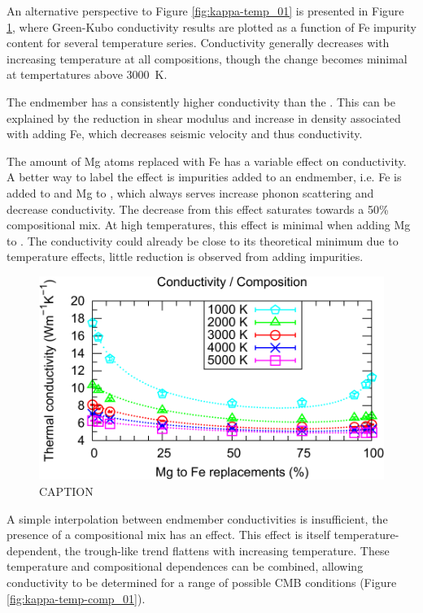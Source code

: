 An alternative perspective to Figure \ref{fig:kappa-temp_01} is presented in Figure \ref{fig:kappa-comp_01}, where Green-Kubo conductivity results are plotted as a function of Fe impurity content for several temperature series. Conductivity generally decreases with increasing temperature at all compositions, though the change becomes minimal at tempertatures above 3000~K.

The \mgsios endmember has a consistently higher conductivity than the \fesio. This can be explained by the reduction in shear modulus and increase in density associated with adding Fe, which decreases seismic velocity and thus conductivity.

The amount of Mg atoms replaced with Fe has a variable effect on conductivity. A better way to label the effect is impurities added to an endmember, i.e. Fe is added to \mgsios and Mg to \fesio, which always serves increase phonon scattering and decrease conductivity. The decrease from this effect saturates towards a 50\% compositional mix. At high temperatures, this effect is minimal when adding Mg to \fesio. The conductivity could already be close to its theoretical minimum due to temperature effects, little reduction is observed from adding impurities.

\begin{figure}[h!]
  \includegraphics[width=\linewidth]{Figures/k-c_all_01.png}
  \caption{CAPTION}
  \label{fig:kappa-comp_01}
\end{figure}

A simple interpolation between endmember conductivities is insufficient, the presence of a compositional mix has an effect. This effect is itself temperature-dependent, the trough-like trend flattens with increasing temperature. These temperature and compositional dependences can be combined, allowing conductivity to be determined for a range of possible CMB conditions (Figure \ref{fig:kappa-temp-comp_01}). 

